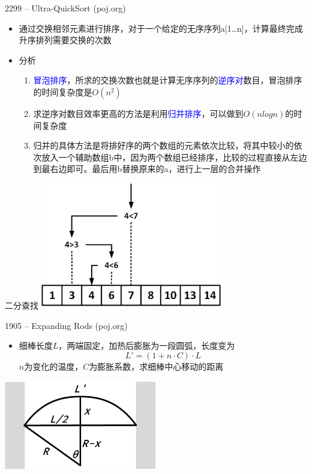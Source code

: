 \begin{frame}{2299 -- Ultra-QuickSort (poj.org)}
    \begin{itemize}
        \item 通过交换相邻元素进行排序，对于一个给定的无序序列a[1…n]，计算最终完成升序排列需要交换的次数
    \end{itemize}
    \vfill
    \begin{itemize}
        \item 分析
        \begin{enumerate}
            \item \textcolor{blue}{冒泡排序}，所求的交换次数也就是计算无序序列的\textcolor{blue}{逆序对}数目，冒泡排序的时间复杂度是$O(n^2)$
            \item 求逆序对数目效率更高的方法是利用\textcolor{blue}{归并排序}，可以做到$O(nlogn)$的时间复杂度
            \item 归并的具体方法是将排好序的两个数组的元素依次比较，将其中较小的依次放入一个辅助数组b中，因为两个数组已经排序，比较的过程直接从左边到最右边即可。最后用b替换原来的a，进行上一层的合并操作
        \end{enumerate}
    \end{itemize}
\end{frame}
\begin{frame}{二分查找}
    \includegraphics[width=0.6\textwidth,center]{fig/2-5.png}
\end{frame}
\begin{frame}{1905 -- Expanding Rods (poj.org)}
    \begin{itemize}
        \item 细棒长度$L$，两端固定，加热后膨胀为一段圆弧，长度变为
        $$L'=(1+n\cdot C)\cdot L$$
        $n$为变化的温度，$C$为膨胀系数，求细棒中心移动的距离
    \end{itemize}
    \vfill
    \includegraphics[width=0.5\textwidth,center]{fig/2-6.png}
\end{frame}
